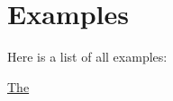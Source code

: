 \section{Examples}
Here is a list of all examples\+:\begin{DoxyCompactItemize}
\item 
\hyperlink{_the-example}{The}
\end{DoxyCompactItemize}
